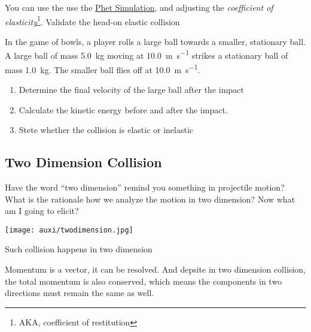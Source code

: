\documentclass[a4paper]{tufte-handout}
\newenvironment{TaskBox} %
{\begin{tcolorbox}[breakable,colback=b1!30,colframe=b1,title=Task]} {\end{tcolorbox}}
\newenvironment{SummBox}
{\begin{tcolorbox}[breakable,colback=r1!30,colframe=r1,title=Summary]} {\end{tcolorbox}}
\begin{document}
You can use the use the \href{https://phet.colorado.edu/sims/html/collision-lab/latest/collision-lab_en.html}{Phet Simulation}, and adjusting the \emph{coefficient of elasticity}\footnote{AKA, coefficient of restitution}. Validate the head-on elastic collision
\begin{TaskBox}
In the game of bowls, a player rolls a large ball towards a smaller, stationary ball. A large ball of mass \SI{5.0}{\kg} moving at \SI{10.0}{\metre\per\second} strikes a stationary ball of mass \SI{1.0}{\kg}. The smaller ball flies off at \SI{10.0}{\metre\per\second}.
\begin{enumerate}
  \item Determine the final velocity of the large ball after the impact
  \item Calculate the kinetic energy before and after the impact.
  \item Stete whether the collision is elastic or inelastic
\end{enumerate}
\vspace{5in}
\end{TaskBox}

\subsection{Two Dimension Collision}
Have the word ``two dimension'' remind you something in projectile motion? What is the rationale how we analyze the motion in two dimension? Now what am I going to elicit?
\begin{marginfigure}
\texttt{[image: auxi/twodimension.jpg]}
\caption{Such collision happens in two dimension}
\end{marginfigure}

\begin{SummBox}
Momentum is a vector, it can be resolved. And depsite in two dimension collision, the total momentum is also conserved, which means the components in two directions must remain the same as well.
\end{SummBox}
\end{document}
